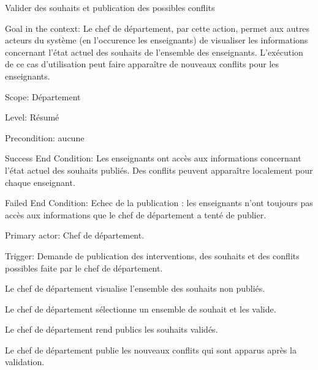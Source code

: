 \begin{usecase}{Valider des souhaits et publication des possibles conflits}
\label{usecase:publier}
\begin{information}
	
\item[{Goal in the context:}]
 Le chef de département, par cette action, permet aux autres acteurs du système (en l'occurence les enseignants) de visualiser les informations concernant l'état actuel des souhaits de l'ensemble des enseignants. 
L'exécution de ce cas d'utilisation peut faire apparaître de nouveaux conflits pour les enseignants.

\item[Scope:] Département

 \item[{Level:}] Résumé

 \item[Precondition:] aucune

 \item[{Success End Condition:}]
Les enseignants ont accès aux informations concernant l'état actuel des souhaits publiés. 
Des conflits peuvent apparaître localement pour chaque enseignant.

 \item[{Failed End Condition:}]
 Echec de la publication : les enseignants n'ont toujours pas accès aux informations que le chef de département a tenté de publier.

\item[Primary actor:] Chef de département.

 \item[{Trigger:}]
 Demande de publication des interventions, des souhaits et des conflits possibles faite par le chef de département.
\end{information}

\begin{scenario}
\item Le chef de département visualise l'ensemble des souhaits non publiés.
 \item Le chef de département sélectionne un ensemble de souhait et les valide.
 \item Le chef de département rend publics les souhaits validés.
 \item Le chef de département publie les nouveaux conflits qui sont apparus après la validation.
\end{scenario}

\end{usecase}

